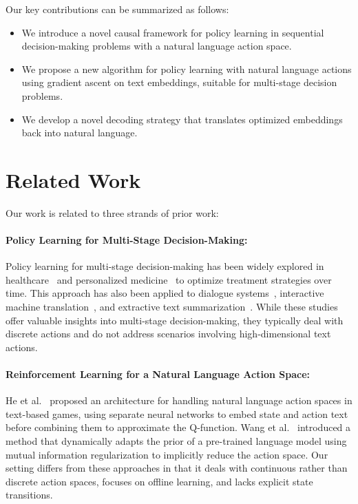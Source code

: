 \documentclass{article}
\begin{document}
Our key contributions can be summarized as follows:


\begin{itemize}[leftmargin=*]
    \item We introduce a novel causal framework for policy learning in sequential decision-making problems with a natural language action space.
    \item We propose a new algorithm for policy learning with natural language actions using gradient ascent on text embeddings, suitable for multi-stage decision problems.
    \item We develop a novel decoding strategy that translates optimized embeddings back into natural language.
\end{itemize}

\section{Related Work}
Our work is related to three strands of prior work:

\paragraph{Policy Learning for Multi-Stage Decision-Making: } 
Policy learning for multi-stage decision-making has been widely explored in healthcare~\cite{moodie2012q,lei2012smart} and personalized medicine~\cite{cain2010start,wahed2004optimal} to optimize treatment strategies over time. This approach has also been applied to dialogue systems~\cite{peng2017composite,zhang2019budgeted}, interactive machine translation~\cite{lam2019interactive,huang2021transmart}, and extractive text summarization~\cite{dong2018banditsum,gu2021memsum}. While these studies offer valuable insights into multi-stage decision-making, they typically deal with discrete actions and do not address scenarios involving high-dimensional text actions.

\paragraph{Reinforcement Learning for a Natural Language Action Space: }
He et al.~\cite{he2015deep} proposed an architecture for handling natural language action spaces in text-based games, using separate neural networks to embed state and action text before combining them to approximate the Q-function. Wang et al.~\cite{wang2024language} introduced a method that dynamically adapts the prior of a pre-trained language model using mutual information regularization to implicitly reduce the action space. Our setting differs from these approaches in that it deals with continuous rather than discrete action spaces, focuses on offline learning, and lacks explicit state transitions.
\end{document}
